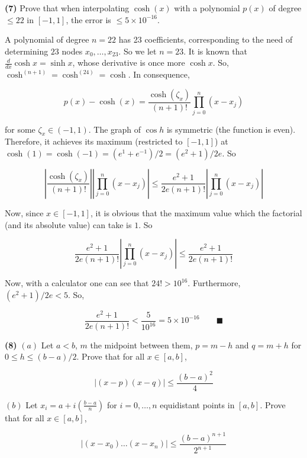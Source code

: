 \documentclass[12pt]{article}
\theoremstyle{definition}
\begin{document}
\pagebreak 

\begin{shaded}
    \textbf{(7)} Prove that when interpolating $\cosh(x)$ with a polynomial $p(x)$ of degree
    $\leq 22$ in $[-1, 1]$, the error is $\leq 5 \times 10^{-16}$.
\end{shaded}

A polynomial of degree $n = 22$ has 23 coefficients, corresponding to the need
of determining $23$ nodes $x_0, \ldots, x_{23}$. So we let $n = 23$. It is known
that $\frac{d}{dx} \cosh x = \sinh x$, whose derivative is once more $\cosh x$.
So, $\cosh^{(n+1)} = \cosh^{(24)} = \cosh$. In consequence,

\begin{equation*}
    p(x) - \cosh(x) = \frac{ \cosh(\zeta_x) }{(n+1)!} \prod_{j=0}^n(x-x_j)
\end{equation*}

for some $\zeta_x \in (-1, 1)$. The graph of $\cos h$ is symmetric (the function
is even). Therefore, it achieves its maximum (restricted to $[-1, 1]$) at
$\cosh(1) = \cosh(-1) = (e^1 + e^{-1}) / 2 = (e^2 + 1)/2e$. So 

\begin{equation*}
    \left| \frac{ \cosh(\zeta_x) }{(n+1)!} \right| \left| \prod_{j=0}^n(x-x_j)
    \right| \leq \frac{e^2 +1}{2e(n+1)!} \left| \prod_{j=0}^n(x-x_j) \right| 
\end{equation*}

Now, since $x \in [-1, 1]$, it is obvious that the maximum value which the
factorial (and its absolute value) can take is $1$. So

\begin{equation*}
    \frac{e^2 +1}{2e(n+1)!} \left| \prod_{j=0}^n(x-x_j) \right| \leq \frac{e^2 +1}{2e(n+1)!}
\end{equation*}

Now, with a calculator one can see that $24! > 10^{16}$. Furthermore, $( e^2 + 1
) / 2e <
5$. So,

\begin{equation*}
    \frac{e^2 +1}{2e(n+1)!} < \frac{5}{10^{16}} = 5\times 10^{-16} \qquad \blacksquare
\end{equation*}

\pagebreak 

\begin{shaded}
    \textbf{(8)} $(a)$ Let $a < b$, $m$ the midpoint between them, $p = m - h$ and 
    $q = m + h$ for $0 \leq h \leq (b-a) / 2$. Prove that for all $x \in [a,
    b]$,

    \begin{equation*}
        \left| (x-p)(x-q) \right|  \leq \frac{( b-a )^2}{4}
    \end{equation*}

    $(b)$ Let $x_i = a + i(\frac{b-a}{n})$ for $i = 0, \ldots, n$
    equidistant points in $[a, b]$. Prove that for all $x \in [a, b]$, 

    \begin{equation*}
        \left| (x-x_0)\ldots(x-x_n) \right|  \leq \frac{(b-a)^{n+1}}{2^{n+1}}
    \end{equation*}
\end{shaded}
\end{document}
